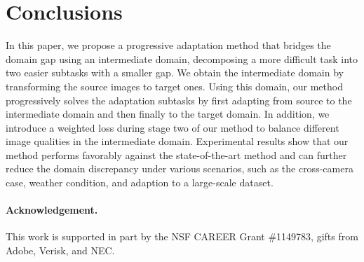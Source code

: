 \documentclass[10pt,twocolumn,letterpaper]{article}
\begin{document}
\section{Conclusions}
In this paper, we propose a progressive adaptation method that bridges the domain gap using an intermediate domain, decomposing a more difficult task into two easier subtasks with a smaller gap.
We obtain the intermediate domain by transforming the source images to target ones.
Using this domain, our method progressively solves the adaptation subtasks by first adapting from source to the intermediate domain and then finally to the target domain.
In addition, we introduce a weighted loss during stage two of our method to balance different image qualities in the intermediate domain.
Experimental results show that our method performs favorably against the state-of-the-art method and can further reduce the domain discrepancy under various scenarios, such as the cross-camera case, weather condition, and adaption to a large-scale dataset.

\vspace{-2mm}
\paragraph{Acknowledgement.}
This work is supported in part by the NSF CAREER Grant \#1149783, gifts from Adobe, Verisk, and NEC.
\clearpage

{\small


}
\end{document}
